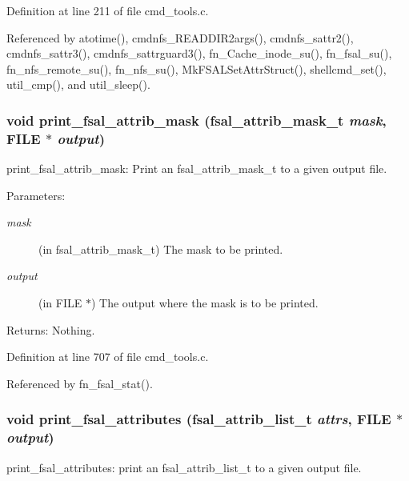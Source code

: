 Definition at line 211 of file cmd\_\-tools.c.

Referenced by atotime(), cmdnfs\_\-READDIR2args(), cmdnfs\_\-sattr2(), cmdnfs\_\-sattr3(), cmdnfs\_\-sattrguard3(), fn\_\-Cache\_\-inode\_\-su(), fn\_\-fsal\_\-su(), fn\_\-nfs\_\-remote\_\-su(), fn\_\-nfs\_\-su(), Mk\-FSALSet\-Attr\-Struct(), shellcmd\_\-set(), util\_\-cmp(), and util\_\-sleep().
\subsubsection{\setlength{\rightskip}{0pt plus 5cm}void print\_\-fsal\_\-attrib\_\-mask (fsal\_\-attrib\_\-mask\_\-t {\em mask}, FILE $\ast$ {\em output})}\label{cmd__tools_8c_a14}


print\_\-fsal\_\-attrib\_\-mask: Print an fsal\_\-attrib\_\-mask\_\-t to a given output file.

\begin{Desc}
\item[Parameters:]
\begin{description}
\item[{\em mask}](in fsal\_\-attrib\_\-mask\_\-t) The mask to be printed. \item[{\em output}](in FILE $\ast$) The output where the mask is to be printed. \end{description}
\end{Desc}
\begin{Desc}
\item[Returns:]Nothing. \end{Desc}


Definition at line 707 of file cmd\_\-tools.c.

Referenced by fn\_\-fsal\_\-stat().
\subsubsection{\setlength{\rightskip}{0pt plus 5cm}void print\_\-fsal\_\-attributes (fsal\_\-attrib\_\-list\_\-t {\em attrs}, FILE $\ast$ {\em output})}\label{cmd__tools_8c_a16}


print\_\-fsal\_\-attributes: print an fsal\_\-attrib\_\-list\_\-t to a given output file.

